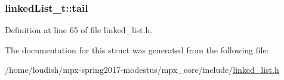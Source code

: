 \subsubsection[{\texorpdfstring{tail}{tail}}]{ linked\+List\+\_\+t\+::tail}\hypertarget{structs__ll_a3253fe5f72d8914dd8331e74aba9982e}{}\label{structs__ll_a3253fe5f72d8914dd8331e74aba9982e}


Definition at line 65 of file linked\+\_\+list.\+h.



The documentation for this struct was generated from the following file\+:\begin{DoxyCompactItemize}
\item 
/home/loudish/mpx-\/spring2017-\/modestus/mpx\+\_\+core/include/\hyperlink{linked__list_8h}{linked\+\_\+list.\+h}\end{DoxyCompactItemize}
